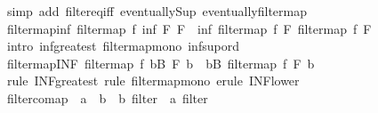 \begin{isabellebody}
\endisadelimproof
%
\isatagproof
{}\isamarkupfalse%
\ {\isacharparenleft}{\kern0pt}simp\ add{\isacharcolon}{\kern0pt}\ filter{\isacharunderscore}{\kern0pt}eq{\isacharunderscore}{\kern0pt}iff\ eventually{\isacharunderscore}{\kern0pt}Sup\ eventually{\isacharunderscore}{\kern0pt}filtermap{\isacharparenright}{\kern0pt}%
\endisatagproof
{\isafoldproof}%
%
\isadelimproof
\isanewline
%
\endisadelimproof
\isanewline
{}\isamarkupfalse%
\ filtermap{\isacharunderscore}{\kern0pt}inf{\isacharcolon}{\kern0pt}\ {\isachardoublequoteopen}filtermap\ f\ {\isacharparenleft}{\kern0pt}inf\ F{}\ F{}{\isacharparenright}{\kern0pt}\ {\isasymle}\ inf\ {\isacharparenleft}{\kern0pt}filtermap\ f\ F{}{\isacharparenright}{\kern0pt}\ {\isacharparenleft}{\kern0pt}filtermap\ f\ F{}{\isacharparenright}{\kern0pt}{\isachardoublequoteclose}\isanewline
%
\isadelimproof
\ \ %
\endisadelimproof
%
\isatagproof
{}\isamarkupfalse%
\ {\isacharparenleft}{\kern0pt}intro\ inf{\isacharunderscore}{\kern0pt}greatest\ filtermap{\isacharunderscore}{\kern0pt}mono\ inf{\isacharunderscore}{\kern0pt}sup{\isacharunderscore}{\kern0pt}ord{\isacharparenright}{\kern0pt}%
\endisatagproof
{\isafoldproof}%
%
\isadelimproof
\isanewline
%
\endisadelimproof
\isanewline
{}\isamarkupfalse%
\ filtermap{\isacharunderscore}{\kern0pt}INF{\isacharcolon}{\kern0pt}\ {\isachardoublequoteopen}filtermap\ f\ {\isacharparenleft}{\kern0pt}{\isasymSqinter}b{\isasymin}B{\isachardot}{\kern0pt}\ F\ b{\isacharparenright}{\kern0pt}\ {\isasymle}\ {\isacharparenleft}{\kern0pt}{\isasymSqinter}b{\isasymin}B{\isachardot}{\kern0pt}\ filtermap\ f\ {\isacharparenleft}{\kern0pt}F\ b{\isacharparenright}{\kern0pt}{\isacharparenright}{\kern0pt}{\isachardoublequoteclose}\isanewline
%
\isadelimproof
\ \ %
\endisadelimproof
%
\isatagproof
{}\isamarkupfalse%
\ {\isacharparenleft}{\kern0pt}rule\ INF{\isacharunderscore}{\kern0pt}greatest{\isacharcomma}{\kern0pt}\ rule\ filtermap{\isacharunderscore}{\kern0pt}mono{\isacharcomma}{\kern0pt}\ erule\ INF{\isacharunderscore}{\kern0pt}lower{\isacharparenright}{\kern0pt}%
\endisatagproof
{\isafoldproof}%
%
\isadelimproof
%
\endisadelimproof
%
\isadelimdocument
%
\endisadelimdocument
%
\isatagdocument
%
\isamarkuptrue%
%
\endisatagdocument
{\isafolddocument}%
%
\isadelimdocument
%
\endisadelimdocument
{}\isamarkupfalse%
\ filtercomap\ {\isacharcolon}{\kern0pt}{\isacharcolon}{\kern0pt}\ {\isachardoublequoteopen}{\isacharparenleft}{\kern0pt}{\isacharprime}{\kern0pt}a\ {\isasymRightarrow}\ {\isacharprime}{\kern0pt}b{\isacharparenright}{\kern0pt}\ {\isasymRightarrow}\ {\isacharprime}{\kern0pt}b\ filter\ {\isasymRightarrow}\ {\isacharprime}{\kern0pt}a\ filter{\isachardoublequoteclose}\ \isanewline

\end{isabellebody}
